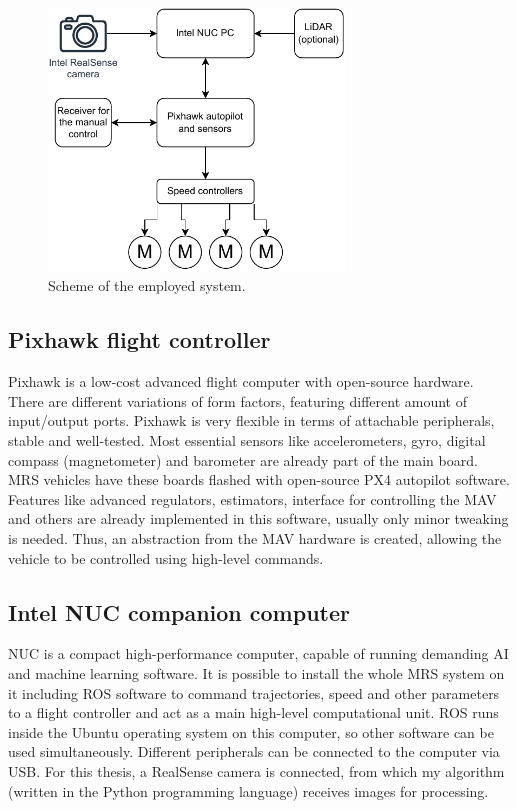 \begin{figure}[!h]
  \centering
  \includegraphics[width=0.7\textwidth]{./fig/photos/system.pdf}
  \caption{Scheme of the employed system.}
  \label{fig:system}
\end{figure}

\subsection{Pixhawk flight controller}

Pixhawk is a low-cost advanced flight computer with open-source hardware. There are different variations of form factors, featuring different amount of input/output ports. Pixhawk is very flexible in terms of attachable peripherals, stable and well-tested. Most essential sensors like accelerometers, gyro, digital compass (magnetometer) and barometer are already part of the main board. \acs{MRS} vehicles have these boards flashed with open-source PX4 autopilot software. Features like advanced regulators, estimators, interface for controlling the \acs{MAV} and others are already implemented in this software, usually only minor tweaking is needed. Thus, an abstraction from the \acs{MAV} hardware is created, allowing the vehicle to be controlled using high-level commands.


\subsection{Intel NUC companion computer}

NUC is a compact high-performance computer, capable of running demanding AI and machine learning software. It is possible to install the whole \acs{MRS} system on it including \acs{ROS} software to command trajectories, speed and other parameters to a flight controller and act as a main high-level computational unit. \acs{ROS} runs inside the Ubuntu operating system on this computer, so other software can be used simultaneously. Different peripherals can be connected to the computer via \acs{USB}. For this thesis, a RealSense camera is connected, from which my algorithm (written in the Python programming language) receives images for processing.

